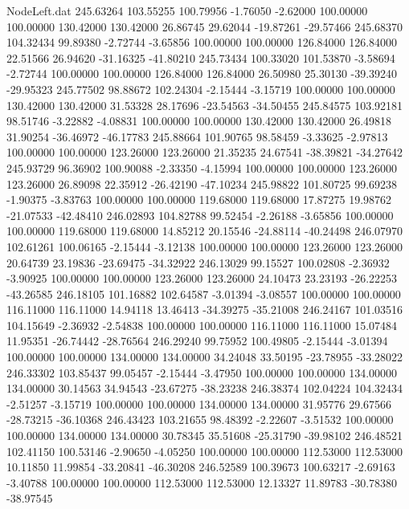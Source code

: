 \begin{filecontents}{NodeLeft.dat}
 245.63264  103.55255  100.79956    -1.76050   -2.62000  100.00000  100.00000  130.42000  130.42000   26.86745   29.62044  -19.87261  -29.57466
 245.68370  104.32434   99.89380    -2.72744   -3.65856  100.00000  100.00000  126.84000  126.84000   22.51566   26.94620  -31.16325  -41.80210
 245.73434  100.33020  101.53870    -3.58694   -2.72744  100.00000  100.00000  126.84000  126.84000   26.50980   25.30130  -39.39240  -29.95323
 245.77502   98.88672  102.24304    -2.15444   -3.15719  100.00000  100.00000  130.42000  130.42000   31.53328   28.17696  -23.54563  -34.50455
 245.84575  103.92181   98.51746    -3.22882   -4.08831  100.00000  100.00000  130.42000  130.42000   26.49818   31.90254  -36.46972  -46.17783
 245.88664  101.90765   98.58459    -3.33625   -2.97813  100.00000  100.00000  123.26000  123.26000   21.35235   24.67541  -38.39821  -34.27642
 245.93729   96.36902  100.90088    -2.33350   -4.15994  100.00000  100.00000  123.26000  123.26000   26.89098   22.35912  -26.42190  -47.10234
 245.98822  101.80725   99.69238    -1.90375   -3.83763  100.00000  100.00000  119.68000  119.68000   17.87275   19.98762  -21.07533  -42.48410
 246.02893  104.82788   99.52454    -2.26188   -3.65856  100.00000  100.00000  119.68000  119.68000   14.85212   20.15546  -24.88114  -40.24498
 246.07970  102.61261  100.06165    -2.15444   -3.12138  100.00000  100.00000  123.26000  123.26000   20.64739   23.19836  -23.69475  -34.32922
 246.13029   99.15527  100.02808    -2.36932   -3.90925  100.00000  100.00000  123.26000  123.26000   24.10473   23.23193  -26.22253  -43.26585
 246.18105  101.16882  102.64587    -3.01394   -3.08557  100.00000  100.00000  116.11000  116.11000   14.94118   13.46413  -34.39275  -35.21008
 246.24167  101.03516  104.15649    -2.36932   -2.54838  100.00000  100.00000  116.11000  116.11000   15.07484   11.95351  -26.74442  -28.76564
 246.29240   99.75952  100.49805    -2.15444   -3.01394  100.00000  100.00000  134.00000  134.00000   34.24048   33.50195  -23.78955  -33.28022
 246.33302  103.85437   99.05457    -2.15444   -3.47950  100.00000  100.00000  134.00000  134.00000   30.14563   34.94543  -23.67275  -38.23238
 246.38374  102.04224  104.32434    -2.51257   -3.15719  100.00000  100.00000  134.00000  134.00000   31.95776   29.67566  -28.73215  -36.10368
 246.43423  103.21655   98.48392    -2.22607   -3.51532  100.00000  100.00000  134.00000  134.00000   30.78345   35.51608  -25.31790  -39.98102
 246.48521  102.41150  100.53146    -2.90650   -4.05250  100.00000  100.00000  112.53000  112.53000   10.11850   11.99854  -33.20841  -46.30208
 246.52589  100.39673  100.63217    -2.69163   -3.40788  100.00000  100.00000  112.53000  112.53000   12.13327   11.89783  -30.78380  -38.97545

\end{filecontents}
